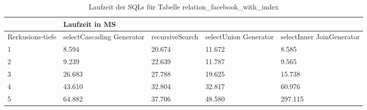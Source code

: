\begin{table}[H]
	\centering
	\begin{tabular}{l|l|l|l|l|l|}
		\cline{2-6}
		& \multicolumn{5}{|l|}{Laufzeit in MS}                                                                                                                                                  \\ \hline
		\multicolumn{1}{|l|}{\multirow{2}{2cm}{Rerkusions-tiefe}} & \multicolumn{2}{|l|}{\multirow{2}{3cm}{selectCascading Generator}} & \multirow{2}{2.8cm}{recursiveSearch} & \multirow{2}{2.5cm}{selectUnion Generator} & \multirow{2}{2.5cm}{selectInner JoinGenerator} \\
		\multicolumn{1}{|l|}{}
		& \multicolumn{2}{|l|}{}                                           &                                  &                                     &                                           \\ \hline
		
		\multicolumn{1}{|l|}{1}                                 & \multicolumn{2}{l|}{8.594}                                       & 20.674                                                & 11.672                                                    & 8.585                                                           \\ \hline
		\multicolumn{1}{|l|}{2}                                 & \multicolumn{2}{l|}{9.239}                                       & 22.639                                                & 11.787                                                    & 9.565                                                           \\ \hline
		\multicolumn{1}{|l|}{3}                                 & \multicolumn{2}{l|}{26.683}                                      & 27.788                                                & 19.625                                                    & 15.738                                                          \\ \hline
		\multicolumn{1}{|l|}{4}                                 & \multicolumn{2}{l|}{43.610}                                      & 32.804                                                & 32.817                                                    & 60.976                                                              \\ \hline
		\multicolumn{1}{|l|}{5}                                 & \multicolumn{2}{l|}{64.882}                                      & 37.706                                                & 48.580                                                    & 297.115                                                         \\ \hline
	\end{tabular}
	\caption{Laufzeit der SQLs für Tabelle relation\_facebook\_with\_index}
\end{table}

